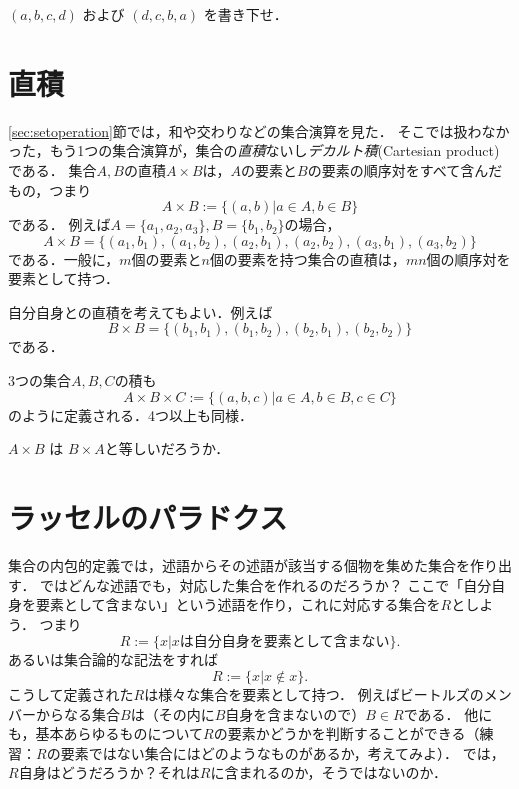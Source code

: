 \documentclass[11pt,a4paper]{jsarticle}
\begin{document}
\begin{exercise}
$(a,b,c,d)$ および $(d,c,b,a)$ を書き下せ．
\end{exercise} 

 
\section{直積}
\ref{sec:setoperation}節では，和や交わりなどの集合演算を見た．
そこでは扱わなかった，もう1つの集合演算が，集合の\emph{直積}ないし\emph{デカルト積}(Cartesian product)である．
集合$A, B$の直積$A \times B$は，$A$の要素と$B$の要素の順序対をすべて含んだもの，つまり
\[
 A \times B := \{ (a, b) | a \in A, b \in B\}
\]
である．
例えば$A = \{a_1, a_2, a_3\}, B = \{b_1, b_2\}$の場合，
\[
A \times B = \{(a_1, b_1), (a_1, b_2), (a_2, b_1), (a_2, b_2), (a_3, b_1), (a_3, b_2)\}
\]
である．一般に，$m$個の要素と$n$個の要素を持つ集合の直積は，$mn$個の順序対を要素として持つ．

自分自身との直積を考えてもよい．例えば
\[
B \times B = \{(b_1, b_1), (b_1, b_2), (b_2, b_1), (b_2, b_2)\}
\]
である．

3つの集合$A, B, C$の積も
\[
 A \times B \times C := \{ (a, b, c) | a \in A, b \in B, c \in C \}
\]
のように定義される．4つ以上も同様．


\begin{exercise}
$A \times B$ は $B \times A$と等しいだろうか．
\end{exercise} 

%


\section{ラッセルのパラドクス}
集合の内包的定義では，述語からその述語が該当する個物を集めた集合を作り出す．
ではどんな述語でも，対応した集合を作れるのだろうか？
ここで「自分自身を要素として含まない」という述語を作り，これに対応する集合を$R$としよう．
つまり
\[
 R := \{x | x \text{は自分自身を要素として含まない}\}.
\]
あるいは集合論的な記法をすれば
\[
 R := \{x | x \not \in x\}.
\]
こうして定義された$R$は様々な集合を要素として持つ．
例えばビートルズのメンバーからなる集合$B$は（その内に$B$自身を含まないので）$B \in R$である．
他にも，基本あらゆるものについて$R$の要素かどうかを判断することができる（練習：$R$の要素ではない集合にはどのようなものがあるか，考えてみよ）．
では，$R$自身はどうだろうか？それは$R$に含まれるのか，そうではないのか．
\end{document}
